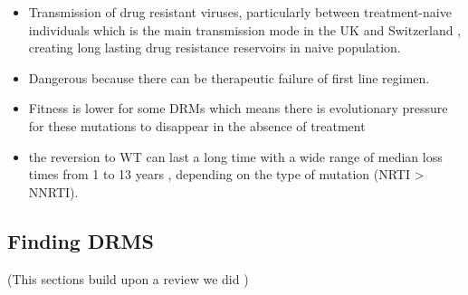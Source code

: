 \documentclass[
  11pt,
  twoside]{scrbook}
\begin{document}
\begin{itemize}
\item
  Transmission of drug resistant viruses, particularly between treatment-naive individuals which is the main transmission mode in the UK \autocite{mouradPhylotypebasedAnalysisHighlights2015,hueDemonstrationSustainedDrugResistant2009} and Switzerland \autocite{drescherTreatmentNaiveIndividualsAre2014}, creating long lasting drug resistance reservoirs in naive population.
\item
  Dangerous because there can be therapeutic failure of first line regimen. \autocite{boermaHighLevelsPretreatment2016}
\item
  Fitness is lower for some DRMs \autocite{kuhnertQuantifyingFitnessCost2018,mespledeViralFitnessCost2013} which means there is evolutionary pressure for these mutations to disappear in the absence of treatment
\item
  the reversion to WT can last a long time with a wide range of median loss times from 1 to 13 years \autocite{castroPersistenceHIV1Transmitted2013}, depending on the type of mutation (NRTI \textgreater{} NNRTI).
\end{itemize}

\hypertarget{finding-drms}{%
\subsection{Finding DRMS}\label{finding-drms}}

(This sections build upon a review we did \autocite{blasselDrugResistanceMutations2021})
\end{document}
